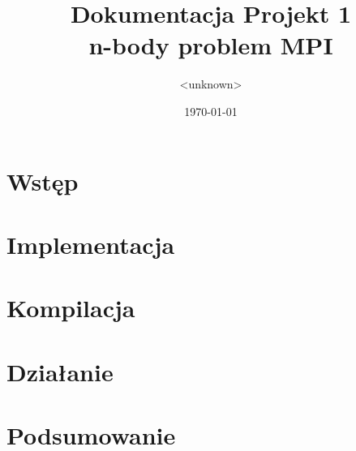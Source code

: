 \documentclass[11pt, titlepage]{article}
\title{Dokumentacja Projekt 1\\n-body problem MPI}
\date{\today}
\author{<unknown>}
\begin{document}
\maketitle

\section{Wstęp}
\section{Implementacja}
\section{Kompilacja}
\section{Działanie}
\section{Podsumowanie}
\end{document}

